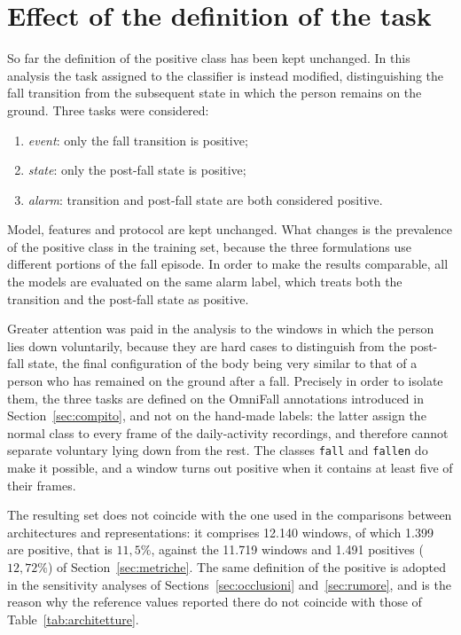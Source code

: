 \section{Effect of the definition of the task}
\label{sec:compito-risultati}

So far the definition of the positive class has been kept unchanged. In this analysis the task assigned to the classifier is instead modified, distinguishing the fall transition from the subsequent state in which the person remains on the ground. Three tasks were considered:
\begin{enumerate}
\item \emph{event}: only the fall transition is positive;
\item \emph{state}: only the post-fall state is positive;
\item \emph{alarm}: transition and post-fall state are both considered positive.
\end{enumerate}

Model, features and protocol are kept unchanged. What changes is the prevalence of the positive class in the training set, because the three formulations use different portions of the fall episode. In order to make the results comparable, all the models are evaluated on the same alarm label, which treats both the transition and the post-fall state as positive.

Greater attention was paid in the analysis to the windows in which the person lies down voluntarily, because they are hard cases to distinguish from the post-fall state, the final configuration of the body being very similar to that of a person who has remained on the ground after a fall. Precisely in order to isolate them, the three tasks are defined on the OmniFall annotations introduced in
Section~\ref{sec:compito}, and not on the hand-made labels: the latter assign the normal class to every frame of the daily-activity recordings, and therefore cannot separate voluntary lying down from the rest. The classes \texttt{fall} and \texttt{fallen} do make it possible, and a window turns out positive when it contains at least five of their frames.

The resulting set does not coincide with the one used in the comparisons between
architectures and representations: it comprises 12.140 windows, of which
1.399 are positive, that is $11{,}5\%$, against the 11.719 windows and
1.491 positives ($12{,}72\%$) of Section~\ref{sec:metriche}. The same
definition of the positive is adopted in the sensitivity analyses of
Sections~\ref{sec:occlusioni} and~\ref{sec:rumore}, and is the reason why the
reference values reported there do not coincide with those of
Table~\ref{tab:architetture}.

